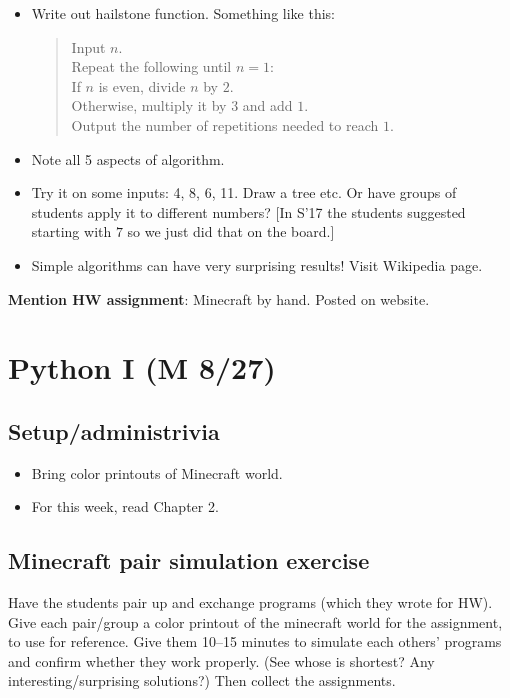 \documentclass{article}
\begin{document}
\begin{itemize}
\item Write out hailstone function. Something like this:
  \begin{quote}
    Input $n$. \\
    Repeat the following until $n = 1$: \\
    \mbox{} \quad If $n$ is even, divide $n$ by $2$. \\
    \mbox{} \quad Otherwise, multiply it by $3$ and add $1$. \\
    Output the number of repetitions needed to reach $1$.
  \end{quote}
\item Note all 5 aspects of algorithm.
\item Try it on some inputs: 4, 8, 6, 11. Draw a tree etc.  Or have
  groups of students apply it to different numbers?  [In S'17 the
  students suggested starting with $7$ so we just did that on the board.]
\item Simple algorithms can have very surprising results!  Visit
  Wikipedia page.
\end{itemize}

\textbf{Mention HW assignment}: Minecraft by hand.  Posted on website.

\newpage

\section{Python I (M 8/27)}

\subsection*{Setup/administrivia}

\begin{itemize}
\item Bring color printouts of Minecraft world.
\item For this week, read Chapter 2.
\end{itemize}

\subsection*{Minecraft pair simulation exercise}

Have the students pair up and exchange programs (which they wrote for
HW).  Give each pair/group a color printout of the minecraft world for
the assignment, to use for reference.  Give them 10--15 minutes to
simulate each others' programs and confirm whether they work properly.
(See whose is shortest? Any interesting/surprising solutions?)  Then
collect the assignments.
\end{document}

